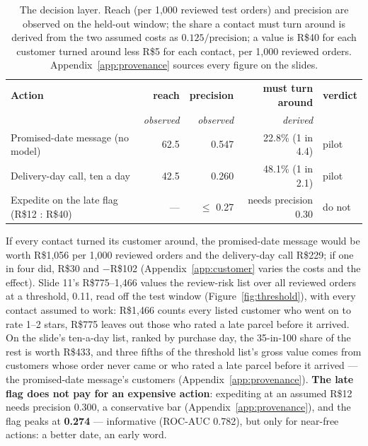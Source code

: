 \begin{table}[htbp]
\centering
\caption{The decision layer. Reach (per 1{,}000 reviewed test orders) and
precision are observed on the held-out window; the share a contact must turn
around is derived from the two assumed costs as $0.125/\text{precision}$; a value
is R\$40 for each customer turned around less R\$5 for each contact, per 1{,}000
reviewed orders. Appendix~\ref{app:provenance} sources every figure on the slides.}
\label{tab:cost}
\footnotesize
\setlength{\tabcolsep}{4pt}
\begin{tabular}{@{}lrrrl@{}}
\toprule
\textbf{Action} & \textbf{reach} & \textbf{precision} &
\textbf{must turn around} & \textbf{verdict} \\
 & \emph{observed} & \emph{observed} & \emph{derived} & \\
\midrule
Promised-date message (no model)   & 62.5 & 0.547 & 22.8\% (1 in 4.4) & pilot \\
Delivery-day call, ten a day       & 42.5 & 0.260 & 48.1\% (1 in 2.1) & pilot \\
Expedite on the late flag (R\$12 : R\$40) & --- & $\le$ 0.27 & needs precision 0.30 & do not \\
\bottomrule
\end{tabular}
\end{table}

If every contact turned its customer around, the promised-date message would be
worth R\$1{,}056 per 1{,}000 reviewed orders and the delivery-day call R\$229; if
one in four did, R\$30 and $-$R\$102 (Appendix~\ref{app:customer} varies the
costs and the effect). Slide 11's R\$775--1{,}466 values the review-risk list over
all reviewed orders at a threshold, 0.11, read off the test window
(Figure~\ref{fig:threshold}), with every contact assumed to work: R\$1{,}466
counts every listed customer who went on to rate 1--2 stars, R\$775 leaves out those
who rated a late parcel before it arrived. On the slide's ten-a-day list, ranked
by purchase day, the 35-in-100 share of the rest is worth R\$433, and three
fifths of the threshold
list's gross value comes from customers whose order never came or who rated a
late parcel before it arrived --- the promised-date message's customers
(Appendix~\ref{app:provenance}).
\textbf{The late flag does not pay for an expensive action}: expediting at an assumed R\$12
needs precision 0.300, a conservative bar (Appendix~\ref{app:provenance}), and
the flag peaks at \textbf{0.274} --- informative (ROC-AUC 0.782), but only for
near-free actions: a better date, an early word.

